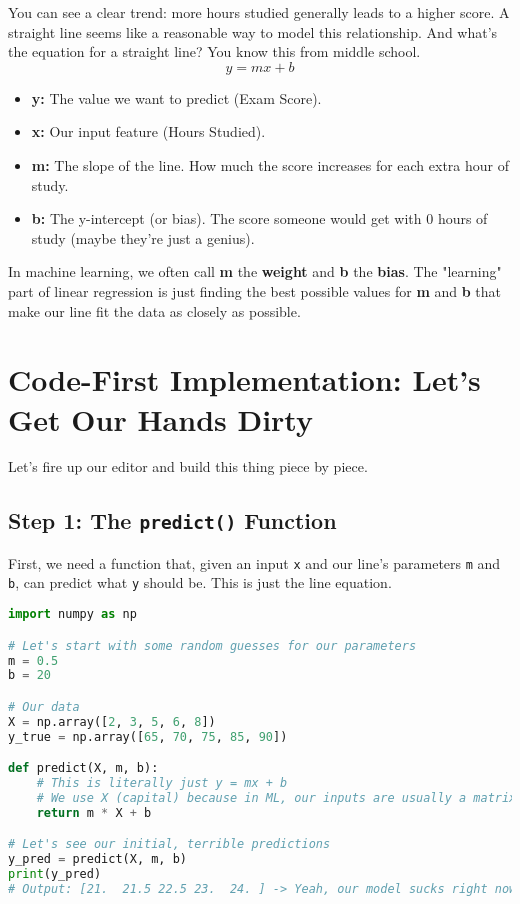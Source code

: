 \documentclass[11pt, letterpaper, openany]{book}
\begin{document}
You can see a clear trend: more hours studied generally leads to a higher score. A straight line seems like a reasonable way to model this relationship. And what's the equation for a straight line? You know this from middle school.
\[ y = mx + b \]
\begin{itemize}
    \item \textbf{y:} The value we want to predict (Exam Score).
    \item \textbf{x:} Our input feature (Hours Studied).
    \item \textbf{m:} The slope of the line. How much the score increases for each extra hour of study.
    \item \textbf{b:} The y-intercept (or bias). The score someone would get with 0 hours of study (maybe they're just a genius).
\end{itemize}
In machine learning, we often call \textbf{m} the \textbf{weight} and \textbf{b} the \textbf{bias}. The "learning" part of linear regression is just finding the best possible values for \textbf{m} and \textbf{b} that make our line fit the data as closely as possible.

\section{Code-First Implementation: Let's Get Our Hands Dirty}

Let's fire up our editor and build this thing piece by piece.

\subsection{Step 1: The \texttt{predict()} Function}

First, we need a function that, given an input \texttt{x} and our line's parameters \texttt{m} and \texttt{b}, can predict what \texttt{y} should be. This is just the line equation.

\begin{lstlisting}[language=Python]
import numpy as np

# Let's start with some random guesses for our parameters
m = 0.5
b = 20

# Our data
X = np.array([2, 3, 5, 6, 8])
y_true = np.array([65, 70, 75, 85, 90])

def predict(X, m, b):
    # This is literally just y = mx + b
    # We use X (capital) because in ML, our inputs are usually a matrix
    return m * X + b

# Let's see our initial, terrible predictions
y_pred = predict(X, m, b)
print(y_pred)
# Output: [21.  21.5 22.5 23.  24. ] -> Yeah, our model sucks right now.
\end{lstlisting}
\end{document}
